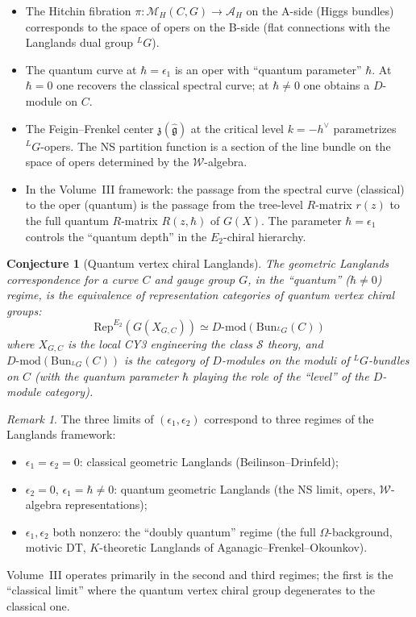 \documentclass[11pt]{article}
\newtheorem{conjecture}[theorem]{Conjecture}
\theoremstyle{definition}
\theoremstyle{remark}
\newtheorem{remark}[theorem]{Remark}
\newcommand{\cA}{\mathcal{A}}
\newcommand{\cM}{\mathcal{M}}
\newcommand{\cW}{\mathcal{W}}
\newcommand{\frakg}{\mathfrak{g}}
\newcommand{\Rep}{\mathrm{Rep}}
\newcommand{\Bun}{\mathrm{Bun}}
\begin{document}
\begin{itemize}[nosep]
 \item The Hitchin fibration $\pi \colon \cM_H(C, G) \to \cA_H$ on the A-side (Higgs bundles)
 corresponds to the space of opers on the B-side (flat connections with the Langlands dual group
 ${}^L G$).
 \item The quantum curve at $\hbar = \epsilon_1$ is an oper with ``quantum parameter'' $\hbar$.
 At $\hbar = 0$ one recovers the classical spectral curve; at $\hbar \neq 0$ one obtains a
 $D$-module on $C$.
 \item The Feigin--Frenkel center $\mathfrak{z}(\widehat{\frakg})$ at the critical level
 $k = -h^\vee$ parametrizes ${}^L G$-opers. The NS partition function is a section of the
 line bundle on the space of opers determined by the $\cW$-algebra.
 \item In the Volume~III framework: the passage from the spectral curve (classical) to the oper
 (quantum) is the passage from the tree-level $R$-matrix $r(z)$ to the full quantum $R$-matrix
 $R(z, \hbar)$ of $G(X)$. The parameter $\hbar = \epsilon_1$ controls the ``quantum depth''
 in the $E_2$-chiral hierarchy.
\end{itemize}

\begin{conjecture}[Quantum vertex chiral Langlands]
 \label{conj:qvcg-langlands}
 The geometric Langlands correspondence for a curve $C$ and gauge group $G$, in the ``quantum''
 ($\hbar \neq 0$) regime, is the equivalence of representation categories of quantum vertex
 chiral groups:
 \begin{equation}
 \label{eq:qvcg-langlands}
 \Rep^{E_2}(G(X_{G,C})) \simeq D\text{-}\mathrm{mod}(\Bun_{{}^L G}(C))
 \end{equation}
 where $X_{G,C}$ is the local CY3 engineering the class $\mathcal{S}$ theory, and
 $D\text{-}\mathrm{mod}(\Bun_{{}^L G}(C))$ is the category of $D$-modules on the moduli
 of ${}^L G$-bundles on $C$ (with the quantum parameter $\hbar$ playing the role of the
 ``level'' of the $D$-module category).
\end{conjecture}

\begin{remark}
 \label{rem:langlands-levels}
 The three limits of $(\epsilon_1, \epsilon_2)$ correspond to three regimes of the Langlands
 framework:
 \begin{itemize}[nosep]
 \item $\epsilon_1 = \epsilon_2 = 0$: classical geometric Langlands (Beilinson--Drinfeld);
 \item $\epsilon_2 = 0$, $\epsilon_1 = \hbar \neq 0$: quantum geometric Langlands (the NS
 limit, opers, $\cW$-algebra representations);
 \item $\epsilon_1, \epsilon_2$ both nonzero: the ``doubly quantum'' regime (the full
 $\Omega$-background, motivic DT, $K$-theoretic Langlands of Aganagic--Frenkel--Okounkov).
 \end{itemize}
 Volume~III operates primarily in the second and third regimes; the first is the
 ``classical limit'' where the quantum vertex chiral group degenerates to the classical one.
\end{remark}
\end{document}
